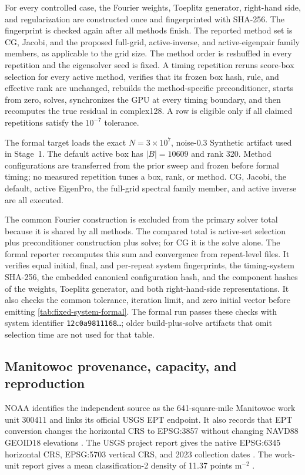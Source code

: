 For every controlled case, the Fourier weights, Toeplitz generator, right-hand
side, and regularization are constructed once and fingerprinted with SHA-256.
The fingerprint is checked again after all methods finish.  The reported
method set is CG, Jacobi, and the proposed full-grid, active-inverse, and
active-eigenpair family members, as applicable to the grid size.  The method order is reshuffled in
every repetition and the eigensolver seed is fixed.  A timing repetition
reruns score-box selection for every active method, verifies that its frozen
box hash, rule, and effective rank are unchanged, rebuilds the method-specific
preconditioner, starts from zero, solves, synchronizes the GPU at every timing
boundary, and then recomputes the true residual in complex128.  A row is
eligible only if all claimed repetitions satisfy the \(10^{-7}\) tolerance.

The formal target loads the exact \(N=3\times10^7\), noise-0.3 Synthetic
artifact used in Stage~1.  The default active box has
\(|B|=10609\) and rank 320.  Method configurations are transferred from the
prior sweep and frozen before formal timing; no measured repetition tunes a
box, rank, or method.  CG, Jacobi, the default, active EigenPro, the full-grid
spectral family member, and active inverse are all executed.

The common Fourier construction is excluded from the primary solver total
because it is shared by all methods.  The compared total is active-set
selection plus preconditioner construction plus solve; for CG it is the solve
alone.  The formal reporter recomputes this sum and convergence from
repeat-level files.  It verifies equal initial, final, and per-repeat system
fingerprints, the timing-system SHA-256, the embedded canonical configuration
hash, and the component hashes of the weights, Toeplitz generator, and both
right-hand-side representations.  It also checks the common tolerance,
iteration limit, and zero initial vector before emitting
\cref{tab:fixed-system-formal}.  The formal run passes these checks with system
identifier \texttt{12c0a9811168\ldots}; older build-plus-solve artifacts that
omit selection time are not used for that table.

\subsection{Manitowoc provenance, capacity, and reproduction}
\label{subsec:manitowoc-reproduction}

NOAA identifies the independent source as the 641-square-mile Manitowoc work
unit 300411 and links its official USGS EPT endpoint.  It also records that EPT
conversion changes the horizontal CRS to EPSG:3857 without changing NAVD88
GEOID18 elevations \cite{noaa_wi2county_2023}.  The USGS project report gives
the native EPSG:6345 horizontal CRS, EPSG:5703 vertical CRS, and 2023
collection dates \cite{usgs_wi2county_project_report}.  The work-unit report
gives a mean classification-2 density of 11.37 points m\(^{-2}\)
\cite{usgs_wi2county_manitowoc_report}.

